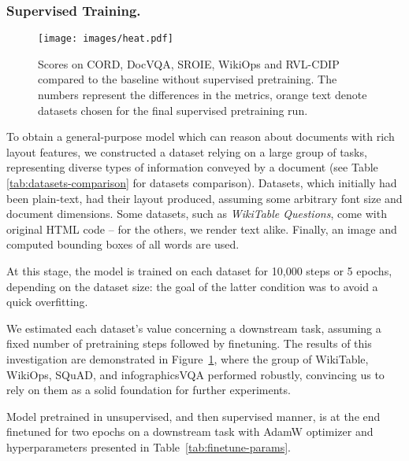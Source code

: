 \documentclass[runningheads]{llncs}
\begin{document}
\subsubsection{Supervised Training.}



\begin{figure}[htp]
\centering
\texttt{[image: images/heat.pdf]}\hfill
\caption{Scores on CORD, DocVQA, SROIE, WikiOps and RVL-CDIP compared to the baseline without supervised pretraining. The numbers represent the differences in the metrics, orange text denote datasets chosen for the final supervised pretraining run.}
\label{fig:pretraining}
\end{figure}

To obtain a general-purpose model which can reason about documents with rich layout features, we constructed a dataset relying on a large group of tasks, representing diverse types of information conveyed by a document (see Table \ref{tab:datasets-comparison} for datasets comparison). Datasets, which initially had been plain-text, had their layout produced, assuming some arbitrary font size and document dimensions. Some datasets, such as \textit{WikiTable Questions}, come with original HTML code -- for the others, we render text alike. Finally, an image and computed bounding boxes of all words are used.

At this stage, the model is trained on each dataset for 10,000 steps or 5 epochs, depending on the dataset size: the goal of the latter condition was to avoid a quick overfitting.



We estimated each dataset's value concerning a downstream task, assuming a fixed number of pretraining steps followed by finetuning. The results of this investigation are demonstrated in Figure~\ref{fig:pretraining}, where the group of WikiTable, WikiOps, SQuAD, and infographicsVQA performed robustly, convincing us to rely on them as a solid foundation for further experiments.

Model pretrained in unsupervised, and then supervised manner, is at the end finetuned for two epochs on a downstream task with AdamW optimizer and hyperparameters presented in Table~\ref{tab:finetune-params}.
\end{document}
